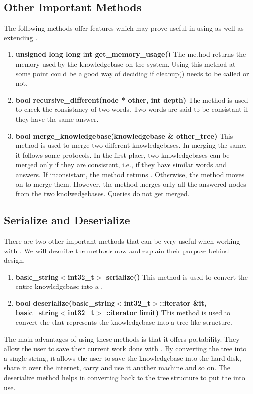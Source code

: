 \subsection{Other Important Methods}
	The following methods offer features which may prove useful in using as well as extending \libalf.
\begin{enumerate}
\item \textbf{unsigned long long int get\_memory\_usage()} \hfill \vskip 1pt
	The method returns the memory used by the knowledgebase on the system. Using this method at some point could be a good way of deciding if cleanup() needs to be called or not. 

\item \textbf{bool recursive\_different(node * other, int depth)} \hfill \vskip 1pt
	The method is used to check the consistancy of two words. Two words are said to be consistant if they have the same answer. 
	
\item \textbf{bool merge\_knowledgebase(knowledgebase \& other\_tree)} \hfill \vskip 1pt
	This method is used to merge two different knowledgebases. In merging the same, it follows some protocols. In the first place, two knowledgebases can be merged only if they are consistant, i.e., if they have similar words and answers. If inconsistant, the method returns \false. Otherwise, the method moves on to merge them. However, the method merges only all the answered nodes from the two knolwedgebases. Queries do not get merged. 
\end{enumerate}

\subsection{Serialize and Deserialize}
	There are two other important methods that can be very useful when working with \libalf. We will describe the methods now and explain their purpose behind design.
\begin{enumerate}
\item \textbf{basic\_string$<$int32\_t$>$ serialize()} \hfill \vskip 1pt
	This method is used to convert the entire knowledgebase into a \stringtype. 
\item \textbf{bool deserialize(basic\_string$<$int32\_t$>$::iterator \&it, basic\_string$<$int32\_t$>$ ::iterator limit)} \hfill \vskip 1pt
	This method is used to convert the \stringtype that represents the knowledgebase into a tree-like structure.
\end{enumerate}	
	The main advantages of using these methods is that it offers portability. They allow the user to save their current work done with \libalf. By converting the tree into a single string, it allows the user to save the knowledgebase into the hard disk, share it over the internet, carry and use it another machine and so on. The deserialize method helps in converting back to the tree structure to put the \libalf into use.
	
